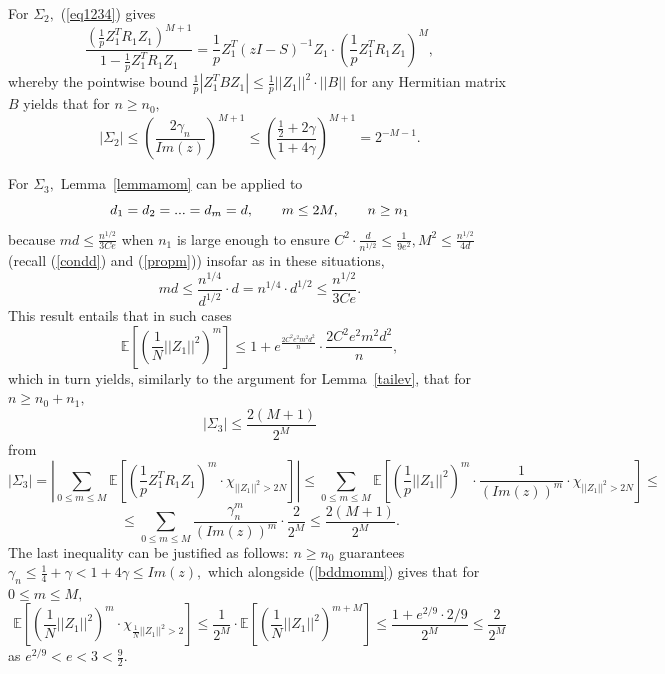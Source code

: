 \documentclass{article}
\numberwithin{equation}{section}
\begin{document}
\par
\vspace{0.2cm}
For \(\Sigma_2,\) (\ref{eq1234}) gives
\[\frac{(\frac{1}{p}Z_1^TR_1Z_1)^{M+1}}{1-\frac{1}{p}Z_1^TR_1Z_1}=\frac{1}{p}Z_1^T(zI-S)^{-1}Z_1 \cdot (\frac{1}{p}Z_1^TR_1Z_1)^{M},\]
whereby the pointwise bound \(\frac{1}{p}|Z_1^TBZ_1| \leq \frac{1}{p}||Z_1||^2 \cdot ||B||\) for any Hermitian matrix \(B\) yields that for \(n \geq n_0,\)
\begin{equation}\label{iibound}\tag{\(e_2\)}
    |\Sigma_2| \leq (\frac{2\gamma_n}{Im(z)})^{M+1} \leq (\frac{\frac{1}{2}+2\gamma}{1+4\gamma})^{M+1}=2^{-M-1}.
\end{equation}
\par
For \(\Sigma_3,\) Lemma~\ref{lemmamom} can be applied to
\[d_1=d_2=...=d_m=d, \hspace{0.7cm} m \leq 2M, \hspace{0.7cm} n \geq n_1\] 
because \(md \leq \frac{n^{1/2}}{3Ce}\) when \(n_1\) is large enough to ensure \(C^2 \cdot \frac{d}{n^{1/2}} \leq \frac{1}{9e^2}, M^2 \leq \frac{n^{1/2}}{4d}\) (recall (\ref{condd}) and (\ref{propm})) insofar as in these situations, 
\[md \leq \frac{n^{1/4}}{d^{1/2}} \cdot d=n^{1/4} \cdot d^{1/2} \leq \frac{n^{1/2}}{3Ce}.\] 
This result entails that in such cases
\begin{equation}\label{bddmomm}
    \mathbb{E}[(\frac{1}{N}||Z_1||^2)^{m}] \leq 1+e^{\frac{2C^2e^2m^2d^2}{n}} \cdot \frac{2C^2e^2m^2d^2}{n},
\end{equation}
which in turn yields, similarly to the argument for Lemma~\ref{tailev}, that for \(n \geq n_0+n_1,\)
\begin{equation}\label{iiibound}\tag{\(e_3\)}
    |\Sigma_3| \leq \frac{2(M+1)}{2^M}
\end{equation}
from
\[|\Sigma_3|=|\sum_{0 \leq m \leq M}{\mathbb{E}[(\frac{1}{p}Z_1^TR_1Z_1)^m\cdot \chi_{||Z_1||^2>2N}]}| \leq \sum_{0 \leq m \leq M}{\mathbb{E}[(\frac{1}{p}||Z_1||^2)^m \cdot \frac{1}{(Im(z))^m} \cdot \chi_{||Z_1||^2>2N}]} \leq\]
\begin{equation}\label{sigma3bd}
    \leq\sum_{0 \leq m \leq M}{\frac{\gamma_n^{m}}{(Im(z))^m} \cdot \frac{2}{2^M}} \leq \frac{2(M+1)}{2^M}.
\end{equation}
The last inequality can be justified as follows: \(n \geq n_0\) guarantees \(\gamma_n \leq \frac{1}{4}+\gamma<1+4\gamma \leq Im(z),\) which alongside (\ref{bddmomm}) gives that for \(0 \leq m \leq M,\)
\[\mathbb{E}[(\frac{1}{N}||Z_1||^2)^m \cdot \chi_{\frac{1}{N}||Z_1||^2>2}] \leq \frac{1}{2^{M}} \cdot \mathbb{E}[(\frac{1}{N}||Z_1||^2)^{m+{M}}] \leq \frac{1+e^{2/9} \cdot 2/9}{2^{M}} \leq \frac{2}{2^{M}}\]
as \(e^{2/9}<e<3<\frac{9}{2}.\)
\end{document}
